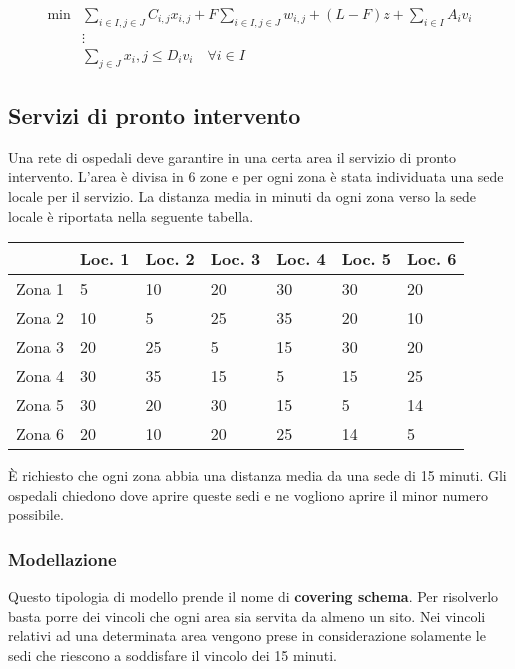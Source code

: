\begin{align*}
\min &\sum\limits_{i \in I, j \in J} C_{i,j} x_{i,j} + F \sum\limits_{i \in I, j \in J} w_{i,j}+ (L-F)z +\sum\limits_{i \in I}A_i v_i \\
&\vdots \\
&\sum\limits_{j \in J} x_i,j \leq D_i v_i \quad\forall i \in I
\end{align*}

\subsection{Servizi di pronto intervento}

Una rete di ospedali deve garantire in una certa area il servizio di pronto intervento. L'area è divisa in 6 zone e per ogni zona è stata individuata una sede locale per il servizio. La distanza media in minuti da ogni zona verso la sede locale è riportata nella seguente tabella.

\begin{table}[htbp]
	\centering
	\begin{tabular}{|l|l|l|l|l|l|l|}
		\hline
		& Loc. 1 & Loc. 2 & Loc. 3 & Loc. 4 & Loc. 5 & Loc. 6 \\ \hline
		Zona 1 & 5 & 10 & 20 & 30 & 30 & 20 \\ \hline
		Zona 2 & 10 & 5 & 25 & 35 & 20 & 10 \\ \hline
		Zona 3 & 20 & 25 & 5 & 15 & 30 & 20 \\ \hline
		Zona 4 & 30 & 35 & 15 & 5 & 15 & 25 \\ \hline
		Zona 5 & 30 & 20 & 30 & 15 & 5 & 14 \\ \hline
		Zona 6 & 20 & 10 & 20 & 25 & 14 & 5 \\ \hline
	\end{tabular}
\end{table}

\noindent \`E richiesto che ogni zona abbia una distanza media da una sede di 15 minuti. Gli ospedali chiedono dove aprire queste sedi e ne vogliono aprire il minor numero possibile.

\subsubsection{Modellazione}

Questo tipologia di modello prende il nome di \textbf{covering schema}. Per risolverlo basta porre dei vincoli che ogni area sia servita da almeno un sito. Nei vincoli relativi ad una determinata area vengono prese in considerazione solamente le sedi che riescono a soddisfare il vincolo dei 15 minuti.

